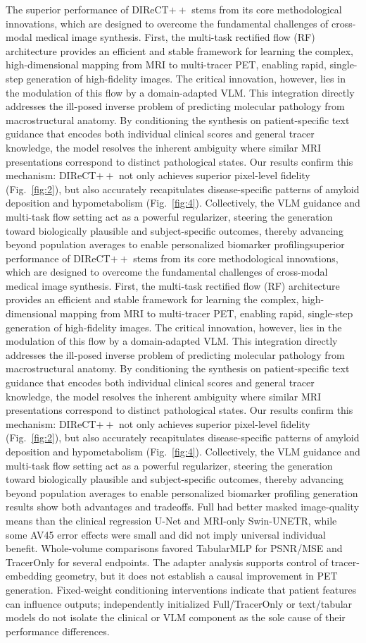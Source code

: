 \documentclass{article}
\providecommand{\DIFaddtex}[1]{{\protect\color{blue} \sf #1}} %
\providecommand{\DIFdeltex}[1]{{\protect\color{red} \ifmmode #1\else\scriptsize #1\fi}} %
\providecommand{\DIFaddbegin}{} %
\providecommand{\DIFaddend}{} %
\providecommand{\DIFdelbegin}{} %
\providecommand{\DIFdelend}{} %
\providecommand{\DIFadd}[1]{\texorpdfstring{\DIFaddtex{#1}}{#1}} %
\providecommand{\DIFdel}[1]{\texorpdfstring{\DIFdeltex{#1}}{}} %
\newcommand{\DIFscaledelfig}{0.5}
\newlength{\DIFdelgraphicswidth} %
\newlength{\DIFdelgraphicsheight} %
\newcommand{\DIFaddincludegraphics}[2][]{{\color{blue}\fbox{\DIFOincludegraphics[#1]{#2}}}} %
\newcommand{\DIFdelincludegraphics}[2][]{%
\sbox{\DIFdelgraphicsbox}{\DIFOincludegraphics[#1]{#2}}%
\settoboxwidth{\DIFdelgraphicswidth}{\DIFdelgraphicsbox} %
\settoboxtotalheight{\DIFdelgraphicsheight}{\DIFdelgraphicsbox} %
\scalebox{\DIFscaledelfig}{%
\parbox[b]{\DIFdelgraphicswidth}{\usebox{\DIFdelgraphicsbox}\\[-\baselineskip] \rule{\DIFdelgraphicswidth}{0em}}\llap{\resizebox{\DIFdelgraphicswidth}{\DIFdelgraphicsheight}{%
\setlength{\unitlength}{\DIFdelgraphicswidth}%
\begin{picture}(1,1)%
\thicklines\linethickness{2pt} %
{\color[rgb]{1,0,0}\put(0,0){\framebox(1,1){}}}%
{\color[rgb]{1,0,0}\put(0,0){\line( 1,1){1}}}%
{\color[rgb]{1,0,0}\put(0,1){\line(1,-1){1}}}%
\end{picture}%
}\hspace*{3pt}}} %
} %
\DeclareRobustCommand{\DIFaddbegin}{\DIFOaddbegin \let\includegraphics\DIFaddincludegraphics} %
\DeclareRobustCommand{\DIFaddend}{\DIFOaddend \let\includegraphics\DIFOincludegraphics} %
\DeclareRobustCommand{\DIFdelbegin}{\DIFOdelbegin \let\includegraphics\DIFdelincludegraphics} %
\DeclareRobustCommand{\DIFdelend}{\DIFOaddend \let\includegraphics\DIFOincludegraphics} %
\begin{document}
The \DIFdelbegin \DIFdel{superior performance of DIReCT$++$ stems from its core methodological innovations, which are designed to overcome the fundamental challenges of cross-modal medical image synthesis. First, the multi-task rectified flow (RF) architecture provides an efficient and stable framework for learning the complex, high-dimensional mapping from MRI to multi-tracer PET, enabling rapid, single-step generation of high-fidelity images. The critical innovation, however, lies in the modulation of this flow by a domain-adapted VLM. This integration directly addresses the ill-posed inverse problem of predicting molecular pathology from macrostructural anatomy. By conditioning the synthesis on patient-specific text guidance that encodes both individual clinical scores and general tracer knowledge, the model resolves the inherent ambiguity where similar MRI presentations correspond to distinct pathological states. Our results confirm this mechanism: DIReCT$++$ not only achieves superior pixel-level fidelity (Fig.~\ref{fig:2}), but also accurately recapitulates disease-specific patterns of amyloid deposition and hypometabolism (Fig.~\ref{fig:4}). Collectively, the VLM guidance and multi-task flow setting act as a powerful regularizer, steering the generation toward biologically plausible and subject-specific outcomes, thereby advancing beyond population averages to enable personalized biomarker profiling}\DIFdelend \DIFaddbegin \DIFadd{generation results show both advantages and tradeoffs. Full had better masked image-quality means than the clinical regression U-Net and MRI-only Swin-UNETR, while some AV45 error effects were small and did not imply universal individual benefit. Whole-volume comparisons favored TabularMLP for PSNR/MSE and TracerOnly for several endpoints. The adapter analysis supports control of tracer-embedding geometry, but it does not establish a causal improvement in PET generation. Fixed-weight conditioning interventions indicate that patient features can influence outputs; independently initialized Full/TracerOnly or text/tabular models do not isolate the clinical or VLM component as the sole cause of their performance differences}\DIFaddend .
\end{document}
